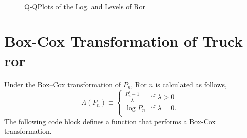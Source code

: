 \documentclass[11pt]{book}
\begin{document}
\begin{figure}[!ht]
\hfill
{}

\caption{Q-QPlots of the Log. and Levels of Ror}
\label{fig:qq_ror}
\end{figure}





\pagebreak
\section{Box-Cox Transformation of Truck ror}

Under the Box--Cox transformation of $P_n$, Ror $n$
is calculated as follows,
$$\Lambda(P_n)\equiv
  \begin{cases}
	\frac{P_n^\lambda-1}{\lambda}	& \textrm{if } \lambda > 0 \\
           \log P_n                     			& \textrm{if } \lambda = 0.\\
  \end{cases}
$$
The following code block defines a function that performs a
Box-Cox transformation.
\end{document}
